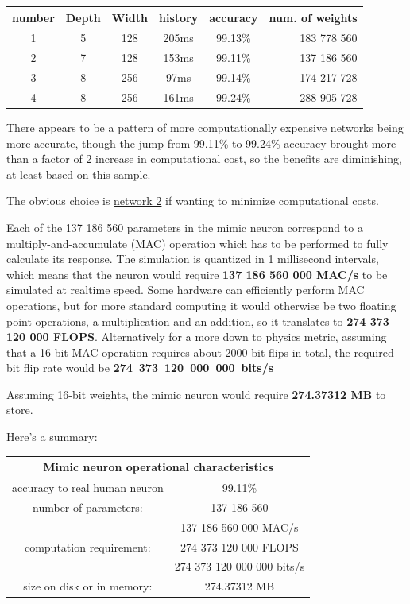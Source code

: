 \documentclass[a4paper]{article}
\begin{document}
	\begin{center}
		\begin{tabular}{c | c | c | c | c | r}
			number & Depth & Width & history & accuracy & num. of weights \\ \hline
			1 & 5 & 128 & 205ms & 99.13\% & 183 778 560 \\ \hline
			2 & 7 & 128 & 153ms & 99.11\% & 137 186 560 \\ \hline
			3 & 8 & 256 & 97ms & 99.14\% & 174 217 728 \\ \hline
			4 & 8 & 256 & 161ms & 99.24\% & 288 905 728 \\
		\end{tabular}
	\end{center}
	
	There appears to be a pattern of more computationally expensive networks being more accurate, though the jump from 99.11\% to 99.24\% accuracy brought more than a factor of 2 increase in computational cost, so the benefits are diminishing, at least based on this sample.
	
	\medskip
	
	The obvious choice is \underline{network 2} if wanting to minimize computational costs.
	
	\bigskip
	
	Each of the 137 186 560 parameters in the mimic neuron correspond to a multiply-and-accumulate (MAC) operation which has to be performed to fully calculate its response. The simulation is quantized in 1 millisecond intervals, which means that the neuron would require \textbf{137 186 560 000 MAC/s} to be simulated at realtime speed. Some hardware can efficiently perform MAC operations, but for more standard computing it would otherwise be two floating point operations, a multiplication and an addition, so it translates to \textbf{274 373 120 000 FLOPS}. Alternatively for a more down to physics metric, assuming that a 16-bit MAC operation requires about 2000 bit flips in total, the required bit flip rate would be \textbf{274~373~120~000~000~bits/s}
	
	\medskip
	
	Assuming 16-bit weights, the mimic neuron would require \textbf{274.37312 MB} to store.
    
    Here's a summary:
	
	\medskip
	
	\begin{center}
		\begin{tabular}{| c | c |}
			\hline
			\multicolumn{2}{|c|}{Mimic neuron operational characteristics} \\\hline
			accuracy to real human neuron & 99.11\% \\\hline
			number of parameters: & 137 186 560 \\\hline
			& 137 186 560 000 MAC/s \\
			computation requirement: & 274 373 120 000 FLOPS \\
			& 274 373 120 000 000 bits/s \\\hline
			size on disk or in memory: & 274.37312 MB \\\hline
		\end{tabular}
	\end{center}
	
\end{document}
